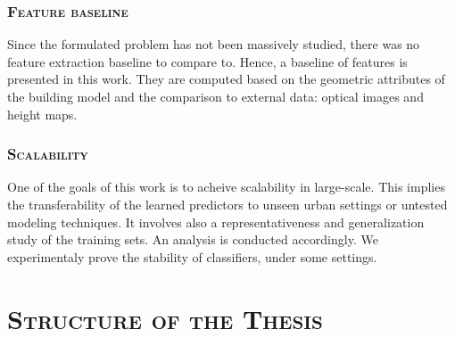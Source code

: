         \subsubsection{\textsc{Feature baseline}}
            Since the formulated problem has not been massively studied, there was no feature extraction baseline to compare to.
            Hence, a baseline of features is presented in this work.
            They are computed based on the geometric attributes of the building model and the comparison to external data: optical images and height maps.
        
        \subsubsection{\textsc{Scalability}}
            One of the goals of this work is to acheive scalability in large-scale.
            This implies the transferability of the learned predictors to unseen urban settings or untested modeling techniques.
            It involves also a representativeness and generalization study of the training sets.
            An analysis is conducted accordingly.
            We experimentaly prove the stability of classifiers, under some settings.

\section{\textsc{Structure of the Thesis}}
    \label{sec::introduction::structure_of_thesis}
